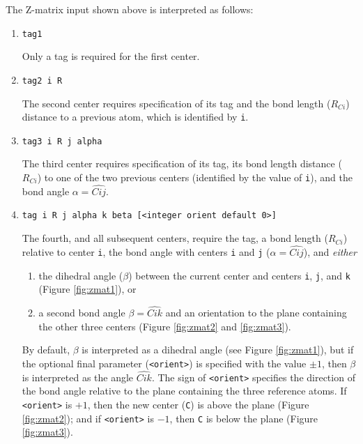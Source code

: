 The Z-matrix input shown above is interpreted as follows:
\begin{enumerate}

   \item \verb+tag1+

   Only  a  tag  is required for the first center.

   \item \verb+tag2 i R+

     The second center requires specification of its tag and the
     bond length ($R_{Ci}$) distance to a previous atom, which is identified by
     \verb+i+.

   \item \verb+tag3 i R j alpha+

     The third center requires specification of its tag, its bond length distance
     ($R_{Ci}$) to one of the two previous centers (identified by the
     value of \verb+i+), and the bond angle $\alpha = \widehat{Cij}$.

   \item \verb+tag i R j alpha k beta [<integer orient default 0>]+

     The fourth, and all subsequent centers, require the tag, a bond
     length ($R_{Ci}$) relative to center \verb+i+, the bond angle with
     centers \verb+i+ and \verb+j+ ($\alpha = \widehat{Cij}$), and {\em either} 
    \begin{enumerate}
    \item the dihedral angle ($\beta$) between the current center and centers
      \verb+i+, \verb+j+, and \verb+k+ (Figure \ref{fig:zmat1}), or
      \item  a second bond angle $\beta = \widehat{Cik}$ and an orientation to 
      the plane containing the other three centers (Figure
      \ref{fig:zmat2} and \ref{fig:zmat3}).
    \end{enumerate}

    By default, $\beta$ is interpreted as a dihedral angle (see Figure
    \ref{fig:zmat1}), but if the optional final parameter (\verb+<orient>+) is
    specified with the value $\pm 1$, then $\beta$ is interpreted as
    the angle $\widehat{Cik}$.  The sign of \verb+<orient>+ specifies the
    direction of the bond angle relative to the plane containing the
    three reference atoms.  If \verb+<orient>+ is $+1$, then the new center
    (\verb+C+) is above the plane (Figure \ref{fig:zmat2}); and if
    \verb+<orient>+ is $-1$, then \verb+C+ is below the plane (Figure
    \ref{fig:zmat3}).
\end{enumerate}

